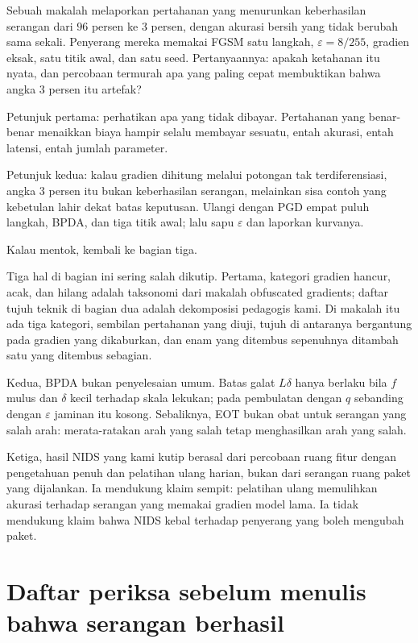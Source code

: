 \begin{tantangan}
Sebuah makalah melaporkan pertahanan yang menurunkan keberhasilan serangan dari $96$
persen ke $3$ persen, dengan akurasi bersih yang tidak berubah sama sekali. Penyerang
mereka memakai FGSM satu langkah, $\varepsilon=8/255$, gradien eksak, satu titik awal,
dan satu seed. Pertanyaannya: apakah ketahanan itu nyata, dan percobaan termurah apa
yang paling cepat membuktikan bahwa angka $3$ persen itu artefak?

Petunjuk pertama: perhatikan apa yang tidak dibayar. Pertahanan yang benar-benar
menaikkan biaya hampir selalu membayar sesuatu, entah akurasi, entah latensi, entah
jumlah parameter.

Petunjuk kedua: kalau gradien dihitung melalui potongan tak terdiferensiasi, angka
$3$ persen itu bukan keberhasilan serangan, melainkan sisa contoh yang kebetulan lahir
dekat batas keputusan. Ulangi dengan PGD empat puluh langkah, BPDA, dan tiga titik awal;
lalu sapu $\varepsilon$ dan laporkan kurvanya.

Kalau mentok, kembali ke bagian tiga.
\end{tantangan}

\begin{untukpeneliti}
Tiga hal di bagian ini sering salah dikutip. Pertama, kategori gradien hancur, acak, dan
hilang adalah taksonomi dari makalah obfuscated gradients; daftar tujuh teknik di bagian
dua adalah dekomposisi pedagogis kami. Di makalah itu ada tiga kategori, sembilan
pertahanan yang diuji, tujuh di antaranya bergantung pada gradien yang dikaburkan, dan
enam yang ditembus sepenuhnya ditambah satu yang ditembus sebagian.

Kedua, BPDA bukan penyelesaian umum. Batas galat $L\delta$ hanya berlaku bila $f$ mulus
dan $\delta$ kecil terhadap skala lekukan; pada pembulatan dengan $q$ sebanding dengan
$\varepsilon$ jaminan itu kosong. Sebaliknya, EOT bukan obat untuk serangan yang salah
arah: merata-ratakan arah yang salah tetap menghasilkan arah yang salah.

Ketiga, hasil NIDS yang kami kutip berasal dari percobaan ruang fitur dengan pengetahuan
penuh dan pelatihan ulang harian, bukan dari serangan ruang paket yang dijalankan. Ia
mendukung klaim sempit: pelatihan ulang memulihkan akurasi terhadap serangan yang memakai
gradien model lama. Ia tidak mendukung klaim bahwa NIDS kebal terhadap penyerang yang
boleh mengubah paket.
\end{untukpeneliti}

\section{Daftar periksa sebelum menulis bahwa serangan berhasil}

